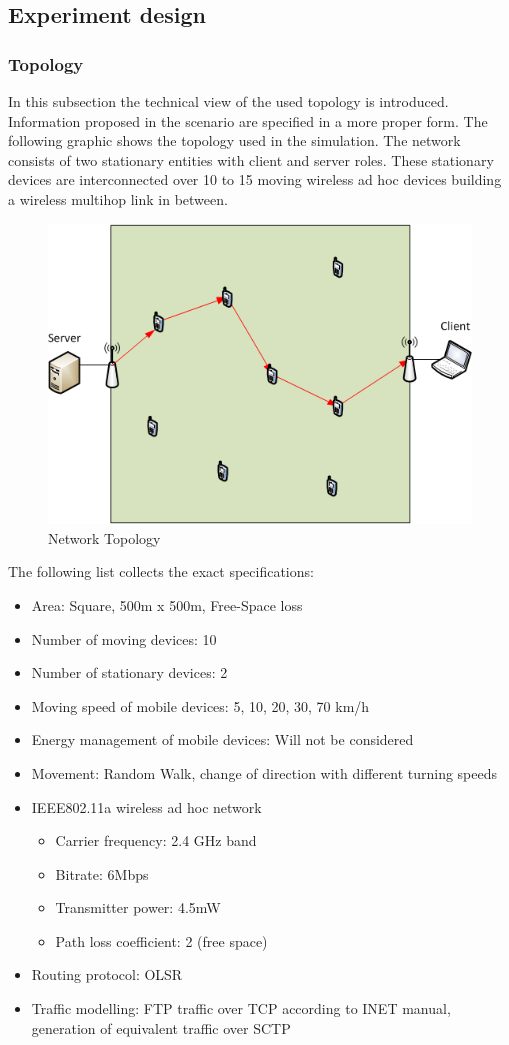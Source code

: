 \documentclass[a4paper]{article}
\begin{document}
\subsection{Experiment design}
\subsubsection{Topology}
In this subsection the technical view of the used topology is introduced. Information proposed in the scenario are specified in a more proper form. The following graphic shows the topology used in the simulation. The network consists of two stationary entities with client and server roles. These stationary devices are interconnected over 10 to 15 moving wireless ad hoc devices building a wireless multihop link in between.
\begin{figure}[ht]
	\centering
	\includegraphics{imgs/Topology}
	\caption{Network Topology}
	\label{fig_topology}
\end{figure}
The following list collects the exact specifications:
\begin{itemize}
	\item Area: Square, 500m x 500m, Free-Space loss
	\item Number of moving devices: 10
	\item Number of stationary devices: 2
	\item Moving speed of mobile devices: 5, 10, 20, 30, 70 km/h
	\item Energy management of mobile devices: Will not be considered
	\item Movement: Random Walk, change of direction with different turning speeds
	\item IEEE802.11a wireless ad hoc network
	\begin{itemize}
		\item Carrier frequency: 2.4 GHz band
		\item Bitrate: 6Mbps
		\item Transmitter power: 4.5mW
		\item Path loss coefficient: 2 (free space)
	\end{itemize}
	\item Routing protocol: OLSR
	\item Traffic modelling: FTP traffic over TCP according to INET manual, generation of equivalent traffic over SCTP
\end{itemize}			
\end{document}

